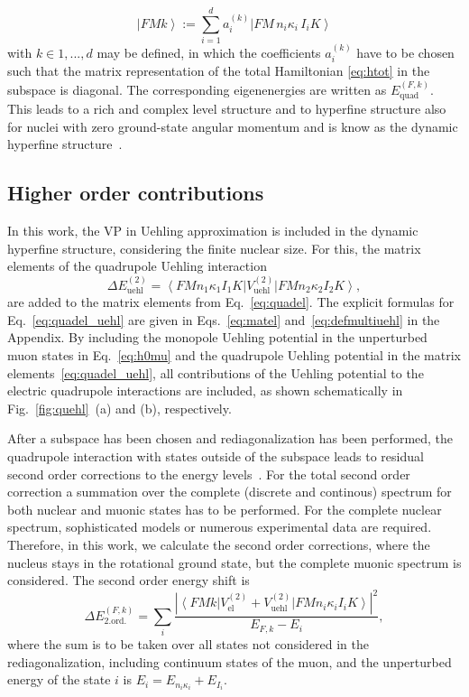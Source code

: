 \begin{equation}
\left| FM k \right> := \sum_{i=1}^{d} a^{(k)}_i \left| FM\,n_i\kappa_i\,I_iK \right>
\label{eq:compstate}
\end{equation}
with $k \in {1,...,d}$ may be defined, in which the coefficients $a_i^{(k)}$ have to be chosen such that the matrix representation of the total Hamiltonian \eqref{eq:htot} in the subspace is diagonal. The corresponding eigenenergies are written as $E^{(F,k)}_{\text{quad}}$. This leads to a rich and complex level structure and to hyperfine structure also for nuclei with zero ground-state angular momentum and is know as the dynamic hyperfine structure~\cite{wu1969,Devons1995}.

\subsection{Higher order contributions}
In this work, the VP in Uehling approximation is included in the dynamic hyperfine structure, considering the finite nuclear size. For this, the matrix elements of the quadrupole Uehling interaction
\begin{equation}
\Delta E^{(2)}_{\text{uehl}} = \left< FMn_1\kappa_1I_1K\right|{V_{\text{uehl}}^{(2)}}\left|FMn_2\kappa_2I_2K\right>,
\label{eq:quadel_uehl}
\end{equation}
are added to the matrix elements from Eq.~\eqref{eq:quadel}. The explicit formulas for Eq.~\eqref{eq:quadel_uehl} are given in Eqs.~\eqref{eq:matel} and~\eqref{eq:defmultiuehl} in the Appendix.
By including the monopole Uehling potential in the unperturbed muon states in Eq.~\eqref{eq:h0mu} and the quadrupole Uehling potential in the matrix elements~\eqref{eq:quadel_uehl}, all contributions of the Uehling potential to the electric quadrupole interactions are included, as shown schematically in Fig.~\ref{fig:quehl}~(a) and (b), respectively.

After a subspace has been chosen and rediagonalization has been performed, the quadrupole interaction with states outside of the subspace leads to residual second order corrections to the energy levels~\cite{chen1970}. 
For the total second order correction a summation over the complete (discrete and continous) spectrum for both nuclear and muonic states has to be performed. For the complete nuclear spectrum, sophisticated models or numerous experimental data are required. Therefore, in this work, we calculate the second order corrections, where the nucleus stays in the rotational ground state, but the complete muonic spectrum is considered.
The second order energy shift is
\begin{equation}
\Delta E_{\text{2.ord.}}^{(F,k)}= \sum_i\frac{\left|\left< FMk\right|{V_{\text{el}}^{(2)}}{+}{V_{\text{uehl}}^{(2)}}\left|FMn_i\kappa_iI_iK \right>\right|^2}{E_{F,k}-E_i},
\label{eq:second}
\end{equation}
where the sum is to be taken over all states not considered in the rediagonalization, including continuum states of the muon, and the unperturbed energy of the state $i$ is $E_i=E_{n_i\kappa_i}+E_{I_i}$.
%
%
